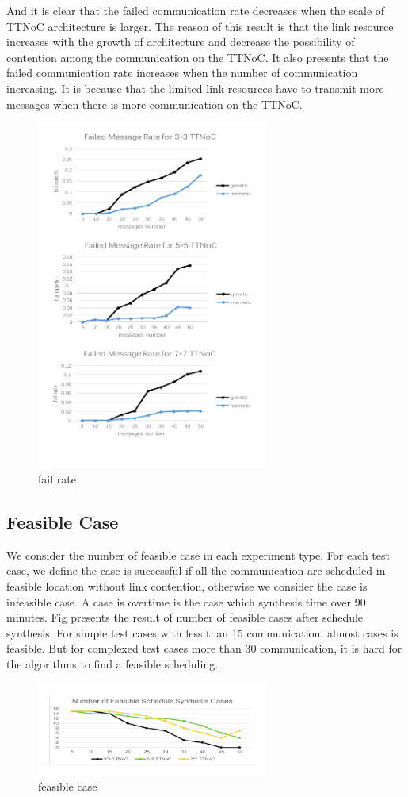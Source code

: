 \documentclass[jornal]{IEEEtran}
\begin{document}
And it is clear that the failed communication rate decreases when the scale of TTNoC architecture is larger. The reason of this result is that the link resource increases with the growth of architecture and decrease the possibility of contention among the communication on the TTNoC. It also presents that the failed communication rate increases when the number of communication increasing. It is because that the limited link resources have to transmit more messages when there is more communication on the TTNoC.
\begin{figure}[!t]
	\centering
	\includegraphics[width=3in]{picture/rate}
	\caption{fail rate}
	\label{f:fail}
\end{figure}

\subsection{Feasible Case}

We consider the number of feasible  case in each experiment type. For each test case, we define the case is successful if all the communication are scheduled in feasible location without link contention, otherwise we consider the case is infeasible case. A case is overtime is the case which synthesis time over 90 minutes. Fig presents the result of number of feasible cases after schedule synthesis. For simple test cases with less than 15 communication, almost cases is feasible. But for complexed test cases more than 30 communication, it is hard for the algorithms to find a feasible scheduling.
\begin{figure}[!t]
	\centering
	\includegraphics[width=3in]{picture/feasible}
	\caption{feasible case}
	\label{f:feasible}
\end{figure}
\end{document}

